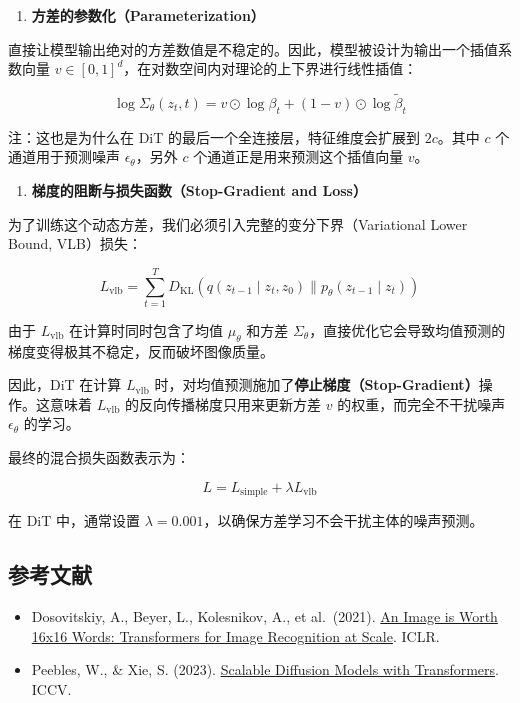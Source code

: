 \begin{enumerate}
\def\labelenumi{\arabic{enumi}.}
\tightlist
\item
  \textbf{方差的参数化（Parameterization）}
\end{enumerate}

直接让模型输出绝对的方差数值是不稳定的。因此，模型被设计为输出一个插值系数向量 \(v\in[0,1]^d\)，在对数空间内对理论的上下界进行线性插值：

\[
\log\Sigma_\theta(z_t,t)=v\odot\log\beta_t+(1-v)\odot\log\tilde{\beta}_t
\]

注：这也是为什么在 DiT 的最后一个全连接层，特征维度会扩展到 \(2c\)。其中 \(c\) 个通道用于预测噪声 \(\epsilon_\theta\)，另外 \(c\) 个通道正是用来预测这个插值向量 \(v\)。

\begin{enumerate}
\def\labelenumi{\arabic{enumi}.}
\setcounter{enumi}{1}
\tightlist
\item
  \textbf{梯度的阻断与损失函数（Stop-Gradient and Loss）}
\end{enumerate}

为了训练这个动态方差，我们必须引入完整的变分下界（Variational Lower Bound, VLB）损失：

\[
L_{\mathrm{vlb}}=\sum_{t=1}^{T}D_{\mathrm{KL}}\left(q(z_{t-1}\mid z_t,z_0)\parallel p_\theta(z_{t-1}\mid z_t)\right)
\]

由于 \(L_{\mathrm{vlb}}\) 在计算时同时包含了均值 \(\mu_\theta\) 和方差 \(\Sigma_\theta\)，直接优化它会导致均值预测的梯度变得极其不稳定，反而破坏图像质量。

因此，DiT 在计算 \(L_{\mathrm{vlb}}\) 时，对均值预测施加了\textbf{停止梯度（Stop-Gradient）}操作。这意味着 \(L_{\mathrm{vlb}}\) 的反向传播梯度只用来更新方差 \(v\) 的权重，而完全不干扰噪声 \(\epsilon_\theta\) 的学习。

最终的混合损失函数表示为：

\[
L=L_{\mathrm{simple}}+\lambda L_{\mathrm{vlb}}
\]

在 DiT 中，通常设置 \(\lambda=0.001\)，以确保方差学习不会干扰主体的噪声预测。

\hypertarget{ux53c2ux8003ux6587ux732e-157}{%
\subsection{参考文献}\label{ux53c2ux8003ux6587ux732e-157}}

\begin{itemize}
\tightlist
\item
  Dosovitskiy, A., Beyer, L., Kolesnikov, A., et al.~(2021). \href{https://arxiv.org/abs/2010.11929}{An Image is Worth 16x16 Words: Transformers for Image Recognition at Scale}. ICLR.
\item
  Peebles, W., \& Xie, S. (2023). \href{https://arxiv.org/abs/2212.09748}{Scalable Diffusion Models with Transformers}. ICCV.
\end{itemize}

